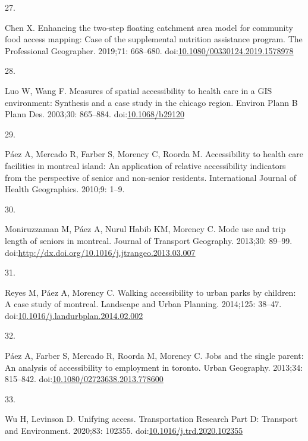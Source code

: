 \documentclass[10pt,letterpaper]{article}
\newlength{\cslhangindent}
\newlength{\csllabelwidth}
\newlength{\cslentryspacingunit} %
\newenvironment{CSLReferences}[2] %
 {%
  \setlength{\parindent}{0pt}
  \ifodd #1
  \let\oldpar\par
  \def\par{\hangindent=\cslhangindent\oldpar}
  \fi
  \setlength{\parskip}{#2\cslentryspacingunit}
 }%
 {}
\newcommand{\CSLLeftMargin}[1]{\parbox[t]{\csllabelwidth}{#1}}
\newcommand{\CSLRightInline}[1]{\parbox[t]{\linewidth - \csllabelwidth}{#1}\break}
\begin{document}
\begin{CSLReferences}{0}{0}
\leavevmode{}%
\CSLLeftMargin{27. }%
\CSLRightInline{Chen X. Enhancing the two-step floating catchment area
model for community food access mapping: Case of the supplemental
nutrition assistance program. The Professional Geographer. 2019;71:
668--680.
doi:\href{https://doi.org/10.1080/00330124.2019.1578978}{10.1080/00330124.2019.1578978}}

\leavevmode{}%
\CSLLeftMargin{28. }%
\CSLRightInline{Luo W, Wang F. Measures of spatial accessibility to
health care in a {GIS} environment: Synthesis and a case study in the
chicago region. Environ Plann B Plann Des. 2003;30: 865--884.
doi:\href{https://doi.org/10.1068/b29120}{10.1068/b29120}}

\leavevmode{}%
\CSLLeftMargin{29. }%
\CSLRightInline{Páez A, Mercado R, Farber S, Morency C, Roorda M.
Accessibility to health care facilities in montreal island: An
application of relative accessibility indicators from the perspective of
senior and non-senior residents. International Journal of Health
Geographics. 2010;9: 1--9. }

\leavevmode{}%
\CSLLeftMargin{30. }%
\CSLRightInline{Moniruzzaman M, Páez A, Nurul Habib KM, Morency C. Mode
use and trip length of seniors in montreal. Journal of Transport
Geography. 2013;30: 89--99.
doi:\url{http://dx.doi.org/10.1016/j.jtrangeo.2013.03.007}}

\leavevmode{}%
\CSLLeftMargin{31. }%
\CSLRightInline{Reyes M, Páez A, Morency C. Walking accessibility to
urban parks by children: A case study of montreal. Landscape and Urban
Planning. 2014;125: 38--47.
doi:\href{https://doi.org/10.1016/j.landurbplan.2014.02.002}{10.1016/j.landurbplan.2014.02.002}}

\leavevmode{}%
\CSLLeftMargin{32. }%
\CSLRightInline{Páez A, Farber S, Mercado R, Roorda M, Morency C. Jobs
and the single parent: An analysis of accessibility to employment in
toronto. Urban Geography. 2013;34: 815--842.
doi:\href{https://doi.org/10.1080/02723638.2013.778600}{10.1080/02723638.2013.778600}}

\leavevmode{}%
\CSLLeftMargin{33. }%
\CSLRightInline{Wu H, Levinson D. Unifying access. Transportation
Research Part D: Transport and Environment. 2020;83: 102355.
doi:\href{https://doi.org/10.1016/j.trd.2020.102355}{10.1016/j.trd.2020.102355}}


\end{CSLReferences}
\end{document}
